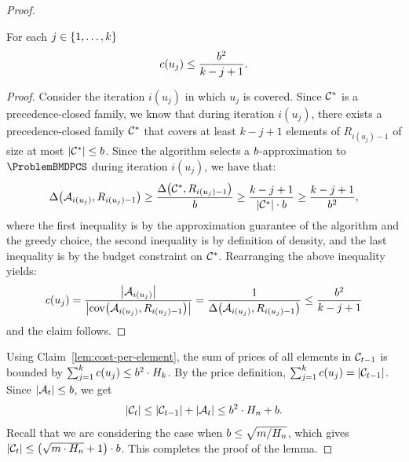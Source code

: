 \begin{proof}
    \begin{claim}\label{lem:cost-per-element}
        For each $j \in \mathopen{}\left\{ 1, \ldots, k \right\}$ 
        \[
        c(u_j) \leq \frac{b^2}{k-j+1}.
        \]
    \end{claim}
    \begin{proof}
     Consider the iteration $i(u_j)$ in which $u_j$ is covered. Since $\mathcal{C}^{*}$ is a precedence-closed family, we know that during iteration $i(u_j)$, there exists a precedence-closed family $\mathcal{C}^{*}$ that covers at least $k-j+1$ elements of $R_{i(u_j)-1}$ of size at most $\mathopen{}\left| \mathcal{C}^{*} \right|\leq b$. Since the algorithm selects a $b$-approximation to $\ProblemBMDPCS$ during iteration $i(u_j)$, we have that:
    \[
    \Delta\mathopen{}\left( \mathcal{A}_{i(u_j)}, R_{i(u_j)-1} \right) \geq \frac{\Delta\mathopen{}\left( \mathcal{C}^{*}, R_{i(u_j)-1} \right)}{b} \geq \frac{k-j+1}{\mathopen{}\left| \mathcal{C}^{*} \right| \cdot b} \geq \frac{k-j+1}{b^2},
    \] 
    where the first inequality is by the approximation guarantee of the algorithm and the greedy choice, the second inequality is by definition of density, and the last inequality is by the budget constraint on $\mathcal{C}^{*}$. Rearranging the above inequality yields:
    \[
    c(u_j) = \frac{\mathopen{}\left| \mathcal{A}_{i(u_j)} \right|}{\mathopen{}\left| \operatorname{cov}\mathopen{}\left( \mathcal{A}_{i(u_j)}, R_{i(u_j)-1} \right) \right|} = 
    \frac{1}{\Delta\mathopen{}\left( \mathcal{A}_{i(u_j)}, R_{i(u_j)-1} \right)} \leq \frac{b^2}{k-j+1}
    \]
    and the claim follows.
    \end{proof}

    Using Claim~\ref{lem:cost-per-element}, the sum of prices of all elements in $\mathcal{C}_{t-1}$ is bounded by $\sum_{j=1}^k c(u_j)\leq b^2\cdot H_k$.
    By the price definition, $\sum_{j=1}^k c(u_j)=\mathopen{}\left| \mathcal{C}_{t-1} \right|$.
    Since $\mathopen{}\left| \mathcal{A}_t \right|\leq b$, we get 
    \[\mathopen{}\left| \mathcal{C}_t \right|\leq\mathopen{}\left| \mathcal{C}_{t-1} \right| + \mathopen{}\left| \mathcal{A}_t \right| \leq b^2\cdot H_n+b.
    \]
    Recall that we are considering the case when $b\leq\sqrt{m/H_n}$, which gives $\mathopen{}\left| \mathcal{C}_t \right|\leq \mathopen{}\left( \sqrt{m\cdot H_n}+1 \right)\cdot b$.
    This completes the proof of the lemma.
\end{proof}


